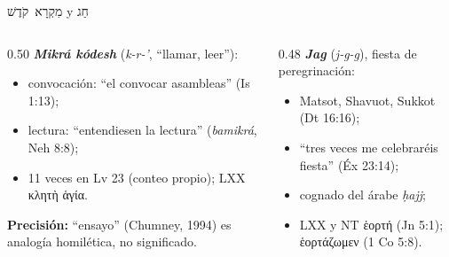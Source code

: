 \documentclass[hyperref={bookmarks=false},aspectratio=169]{beamer}
\newcommand{\heb}[1]{\mbox{\foreignlanguage{hebrew}{#1}}}
\newcommand{\grc}[1]{\foreignlanguage{ancientgreek}{#1}}
\newcommand{\destacar}[1]{\textbf{\textcolor{tierraroja}{#1}}}
\newcommand{\precision}[1]{{\footnotesize\color{sepia}\textbf{Precisión:} #1}}
\begin{document}
\begin{frame}{\heb{מִקְרָא קֹדֶשׁ} y \heb{חַג}}
\begin{columns}[t,onlytextwidth]
\begin{column}{0.50\textwidth}\small
\destacar{\emph{Mikrá kódesh}} (\emph{k-r-'}, ``llamar, leer''):
\begin{itemize}\scriptsize
\item convocación: ``el convocar asambleas'' (Is 1:13);
\item lectura: ``entendiesen la lectura'' (\emph{bamikrá}, Neh 8:8);
\item 11 veces en Lv 23 (conteo propio); LXX \grc{κλητὴ ἁγία}.
\end{itemize}
\precision{``ensayo'' (Chumney, 1994) es analogía homilética, no significado.}
\end{column}
\begin{column}{0.48\textwidth}\small
\destacar{\emph{Jag}} (\emph{j-g-g}), fiesta de peregrinación:
\begin{itemize}\scriptsize
\item Matsot, Shavuot, Sukkot (Dt 16:16);
\item ``tres veces me celebraréis fiesta'' (Éx 23:14);
\item cognado del árabe \emph{ḥajj};
\item LXX y NT \grc{ἑορτή} (Jn 5:1); \grc{ἑορτάζωμεν} (1 Co 5:8).
\end{itemize}
\end{column}
\end{columns}
\end{frame}
\end{document}
